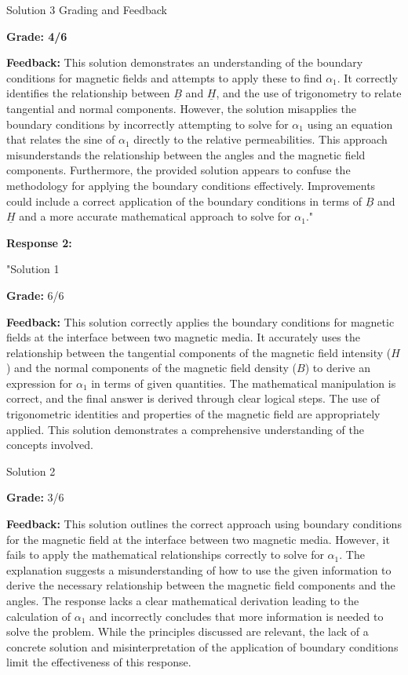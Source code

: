\documentclass[a4paper,11pt]{article}
\begin{document}
Solution 3 Grading and Feedback

\textbf{Grade: 4/6}

\textbf{Feedback:} This solution demonstrates an understanding of the boundary conditions for magnetic fields and attempts to apply these to find \( \alpha_{1} \). It correctly identifies the relationship between \( \underline{B} \) and \( \underline{H} \), and the use of trigonometry to relate tangential and normal components. However, the solution misapplies the boundary conditions by incorrectly attempting to solve for \( \alpha_{1} \) using an equation that relates the sine of \( \alpha_{1} \) directly to the relative permeabilities. This approach misunderstands the relationship between the angles and the magnetic field components. Furthermore, the provided solution appears to confuse the methodology for applying the boundary conditions effectively. Improvements could include a correct application of the boundary conditions in terms of \( \underline{B} \) and \( \underline{H} \) and a more accurate mathematical approach to solve for \( \alpha_{1} \)."

\textbf{Response 2:}

"Solution 1

\textbf{Grade:} 6/6

\textbf{Feedback:} This solution correctly applies the boundary conditions for magnetic fields at the interface between two magnetic media. It accurately uses the relationship between the tangential components of the magnetic field intensity (\(H\)) and the normal components of the magnetic field density (\(B\)) to derive an expression for \(\alpha_{1}\) in terms of given quantities. The mathematical manipulation is correct, and the final answer is derived through clear logical steps. The use of trigonometric identities and properties of the magnetic field are appropriately applied. This solution demonstrates a comprehensive understanding of the concepts involved.

Solution 2

\textbf{Grade:} 3/6

\textbf{Feedback:} This solution outlines the correct approach using boundary conditions for the magnetic field at the interface between two magnetic media. However, it fails to apply the mathematical relationships correctly to solve for \(\alpha_{1}\). The explanation suggests a misunderstanding of how to use the given information to derive the necessary relationship between the magnetic field components and the angles. The response lacks a clear mathematical derivation leading to the calculation of \(\alpha_{1}\) and incorrectly concludes that more information is needed to solve the problem. While the principles discussed are relevant, the lack of a concrete solution and misinterpretation of the application of boundary conditions limit the effectiveness of this response.
\end{document}
